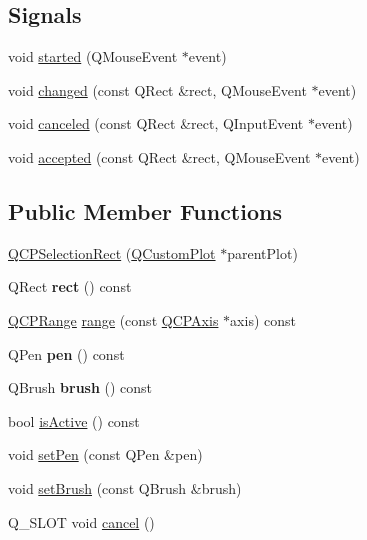 \subsection*{Signals}
\begin{DoxyCompactItemize}
\item 
void \hyperlink{classQCPSelectionRect_a7b7162d19f4f2174d3644ff1a5d335aa}{started} (Q\+Mouse\+Event $\ast$event)
\item 
void \hyperlink{classQCPSelectionRect_a1bab11026bca52740c2e6682623e6964}{changed} (const Q\+Rect \&rect, Q\+Mouse\+Event $\ast$event)
\item 
void \hyperlink{classQCPSelectionRect_aeb82009393c90130102dccf36477b906}{canceled} (const Q\+Rect \&rect, Q\+Input\+Event $\ast$event)
\item 
void \hyperlink{classQCPSelectionRect_a15a43542e1f7b953a44c260b419e6d2c}{accepted} (const Q\+Rect \&rect, Q\+Mouse\+Event $\ast$event)
\end{DoxyCompactItemize}
\subsection*{Public Member Functions}
\begin{DoxyCompactItemize}
\item 
\hyperlink{classQCPSelectionRect_ade6ee59fabcc585a1e281eb527b01867}{Q\+C\+P\+Selection\+Rect} (\hyperlink{classQCustomPlot}{Q\+Custom\+Plot} $\ast$parent\+Plot)
\item 
Q\+Rect {\bfseries rect} () const \hypertarget{classQCPSelectionRect_a426d8186b04c264eb97c0713431f42fa}{}\label{classQCPSelectionRect_a426d8186b04c264eb97c0713431f42fa}

\item 
\hyperlink{classQCPRange}{Q\+C\+P\+Range} \hyperlink{classQCPSelectionRect_abef79a750c3469e88554fe134d0510fd}{range} (const \hyperlink{classQCPAxis}{Q\+C\+P\+Axis} $\ast$axis) const 
\item 
Q\+Pen {\bfseries pen} () const \hypertarget{classQCPSelectionRect_a96fe01abf40bc71863ce582d843eb07c}{}\label{classQCPSelectionRect_a96fe01abf40bc71863ce582d843eb07c}

\item 
Q\+Brush {\bfseries brush} () const \hypertarget{classQCPSelectionRect_a3759fd762c5913fc8a0fd6aa6ff4e7ff}{}\label{classQCPSelectionRect_a3759fd762c5913fc8a0fd6aa6ff4e7ff}

\item 
bool \hyperlink{classQCPSelectionRect_a5eb64ab5638c04a952e230de3766470e}{is\+Active} () const 
\item 
void \hyperlink{classQCPSelectionRect_ada20b7fb1b2dcbe50523262636b06963}{set\+Pen} (const Q\+Pen \&pen)
\item 
void \hyperlink{classQCPSelectionRect_ab0c66f1484418782efa01f4153611080}{set\+Brush} (const Q\+Brush \&brush)
\item 
Q\+\_\+\+S\+L\+OT void \hyperlink{classQCPSelectionRect_af67bc58f4f5ce9a4dc420b9c42de235a}{cancel} ()
\end{DoxyCompactItemize}
